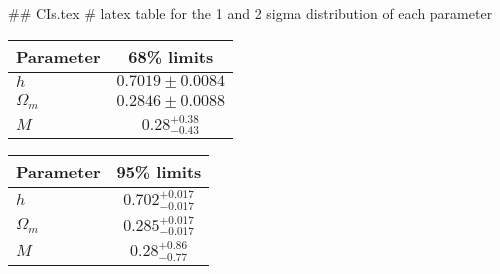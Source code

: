 ## CIs.tex
# latex table for the 1 and 2 sigma distribution of each parameter

\begin{tabular} { l  c}
 Parameter &  68\% limits\\
\hline
{\boldmath$h              $} & $0.7019\pm 0.0084          $\\
{\boldmath$\Omega_m       $} & $0.2846\pm 0.0088          $\\
{\boldmath$M              $} & $0.28^{+0.38}_{-0.43}      $\\
\hline
\end{tabular}

\begin{tabular} { l  c}
 Parameter &  95\% limits\\
\hline
{\boldmath$h              $} & $0.702^{+0.017}_{-0.017}   $\\
{\boldmath$\Omega_m       $} & $0.285^{+0.017}_{-0.017}   $\\
{\boldmath$M              $} & $0.28^{+0.86}_{-0.77}      $\\
\hline
\end{tabular}
